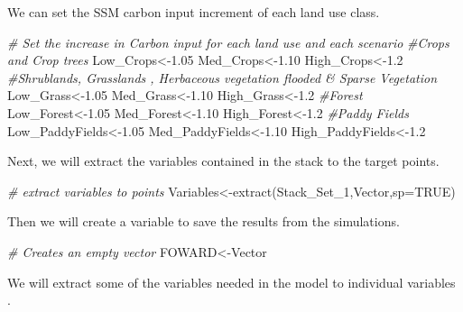 \documentclass[
  10pt,
  b5paper,
]{book}
\newenvironment{Shaded}{\begin{snugshade}}{\end{snugshade}}
\newcommand{\AttributeTok}[1]{\textcolor[rgb]{0.77,0.63,0.00}{#1}}
\newcommand{\CommentTok}[1]{\textcolor[rgb]{0.56,0.35,0.01}{\textit{#1}}}
\newcommand{\ConstantTok}[1]{\textcolor[rgb]{0.00,0.00,0.00}{#1}}
\newcommand{\FloatTok}[1]{\textcolor[rgb]{0.00,0.00,0.81}{#1}}
\newcommand{\FunctionTok}[1]{\textcolor[rgb]{0.00,0.00,0.00}{#1}}
\newcommand{\NormalTok}[1]{#1}
\newcommand{\OtherTok}[1]{\textcolor[rgb]{0.56,0.35,0.01}{#1}}
\begin{document}
We can set the SSM carbon input increment of each land use class.

\begin{Shaded}
\begin{Highlighting}[]
\CommentTok{\# Set the increase in Carbon input for each land use and each scenario}
\CommentTok{\#Crops and Crop trees}
\NormalTok{Low\_Crops}\OtherTok{\textless{}{-}}\FloatTok{1.05}
\NormalTok{Med\_Crops}\OtherTok{\textless{}{-}}\FloatTok{1.10}
\NormalTok{High\_Crops}\OtherTok{\textless{}{-}}\FloatTok{1.2}
\CommentTok{\#Shrublands, Grasslands , Herbaceous vegetation flooded \& Sparse Vegetation}
\NormalTok{Low\_Grass}\OtherTok{\textless{}{-}}\FloatTok{1.05}
\NormalTok{Med\_Grass}\OtherTok{\textless{}{-}}\FloatTok{1.10}
\NormalTok{High\_Grass}\OtherTok{\textless{}{-}}\FloatTok{1.2}
\CommentTok{\#Forest}
\NormalTok{Low\_Forest}\OtherTok{\textless{}{-}}\FloatTok{1.05}
\NormalTok{Med\_Forest}\OtherTok{\textless{}{-}}\FloatTok{1.10}
\NormalTok{High\_Forest}\OtherTok{\textless{}{-}}\FloatTok{1.2}
\CommentTok{\#Paddy Fields}
\NormalTok{Low\_PaddyFields}\OtherTok{\textless{}{-}}\FloatTok{1.05}
\NormalTok{Med\_PaddyFields}\OtherTok{\textless{}{-}}\FloatTok{1.10}
\NormalTok{High\_PaddyFields}\OtherTok{\textless{}{-}}\FloatTok{1.2}
\end{Highlighting}
\end{Shaded}

Next, we will extract the variables contained in the stack to the target points.

\begin{Shaded}
\begin{Highlighting}[]
\CommentTok{\# extract variables to points}
\NormalTok{Variables}\OtherTok{\textless{}{-}}\FunctionTok{extract}\NormalTok{(Stack\_Set\_1,Vector,}\AttributeTok{sp=}\ConstantTok{TRUE}\NormalTok{)}
\end{Highlighting}
\end{Shaded}

Then we will create a variable to save the results from the simulations.

\begin{Shaded}
\begin{Highlighting}[]
\CommentTok{\# Creates an empty vector}
\NormalTok{FOWARD}\OtherTok{\textless{}{-}}\NormalTok{Vector}
\end{Highlighting}
\end{Shaded}

We will extract some of the variables needed in the model to individual variables .
\end{document}
